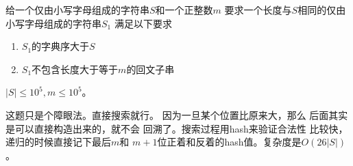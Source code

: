 \begin{prob}
	给一个仅由小写字母组成的字符串$S$和一个正整数$m$
	要求一个长度与$S$相同的仅由小写字母组成的字符串$S_1$
	满足以下要求
　　\begin{enumerate}
		\item $S_1$的字典序大于$S$
		\item $S_1$不包含长度大于等于$m$的回文子串
	\end{enumerate}
	$|S| \le 10^5, m \le 10^5$。
\end{prob}

\begin{sol}
	这题只是个障眼法。直接搜索就行。
	因为一旦某个位置比原来大，那么
	后面其实是可以直接构造出来的，就不会
	回溯了。搜索过程用hash来验证合法性
	比较快，递归的时候直接记下最后$m$和
	$m+1$位正着和反着的hash值。复杂度是$O(26|S|)$。
\end{sol}
